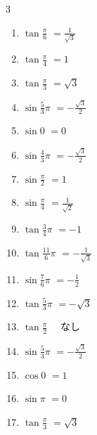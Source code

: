 \begin{multicols}{3}
\begin{enumerate}
  \item $\displaystyle \tan{\frac{\pi}{6}}$
        $\displaystyle =\frac{1}{\sqrt{3}}$

  \item $\displaystyle \tan{\frac{\pi}{4}}$
        $\displaystyle =1$

  \item $\displaystyle \tan{\frac{\pi}{3}}$
        $\displaystyle =\sqrt{3}$

  \item $\displaystyle \sin{\frac{5}{3}\pi}$
        $\displaystyle =-\frac{\sqrt{3}}{2}$

  \item $\displaystyle \sin{0}$
        $\displaystyle =0$

  \item $\displaystyle \sin{\frac{4}{3}\pi}$
        $\displaystyle =-\frac{\sqrt{3}}{2}$

  \item $\displaystyle \sin{\frac{\pi}{2}}$
        $\displaystyle =1$

  \item $\displaystyle \sin{\frac{\pi}{4}}$
        $\displaystyle =\frac{1}{\sqrt{2}}$

  \item $\displaystyle \tan{\frac{3}{4}\pi}$
        $\displaystyle =-1$

  \item $\displaystyle \tan{\frac{11}{6}\pi}$
        $\displaystyle =-\frac{1}{\sqrt{3}}$

  \item $\displaystyle \sin{\frac{7}{6}\pi}$
        $\displaystyle =-\frac{1}{2}$

  \item $\displaystyle \tan{\frac{5}{3}\pi}$
        $\displaystyle =-\sqrt{3}$

  \item $\displaystyle \tan{\frac{\pi}{2}}$
        $\displaystyle \quad なし$

  \item $\displaystyle \sin{\frac{5}{3}\pi}$
        $\displaystyle =-\frac{\sqrt{3}}{2}$

  \item $\displaystyle \cos{0}$
        $\displaystyle =1$

  \item $\displaystyle \sin{\pi}$
        $\displaystyle =0$

  \item $\displaystyle \tan{\frac{\pi}{3}}$
        $\displaystyle =\sqrt{3}$


\end{enumerate}
\end{multicols}
